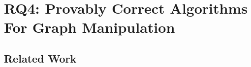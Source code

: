 \chapter{RQ4: Provably Correct Algorithms For Graph Manipulation}%
\label{chap:RQ4}

\section{Related Work}\label{RQ4:sec:rw}

